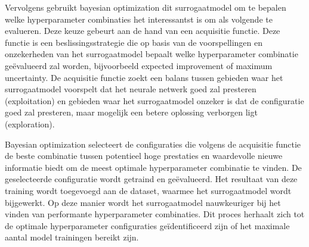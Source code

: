 Vervolgens gebruikt bayesian optimization dit surrogaatmodel om te bepalen welke hyperparameter combinaties het interessantst is om als volgende te evalueren. Deze keuze gebeurt aan de hand van een acquisitie functie. Deze functie is een beslissingsstrategie die op basis van de voorspellingen en onzekerheden van het surrogaatmodel bepaalt welke hyperparameter combinatie geëvalueerd zal worden, bijvoorbeeld expected improvement of maximum uncertainty. De acquisitie functie zoekt een balans tussen gebieden waar het surrogaatmodel voorspelt dat het neurale netwerk goed zal presteren (exploitation) en gebieden waar het surrogaatmodel onzeker is dat de configuratie goed zal presteren, maar mogelijk een betere oplossing verborgen ligt (exploration).

Bayesian optimization selecteert de configuraties die volgens de acquisitie functie de beste combinatie tussen potentieel hoge prestaties en waardevolle nieuwe informatie biedt om de meest optimale hyperparameter combinatie te vinden. De geselecteerde configuratie wordt getraind en geëvalueerd. Het resultaat van deze training wordt toegevoegd aan de dataset, waarmee het surrogaatmodel wordt bijgewerkt. Op deze manier wordt het surrogaatmodel nauwkeuriger bij het vinden van performante hyperparameter combinaties. Dit proces herhaalt zich tot de optimale hyperparameter configuraties geïdentificeerd zijn of het maximale aantal model trainingen bereikt zijn.

